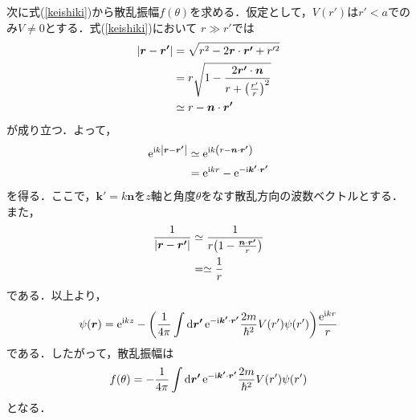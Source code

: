 \documentclass{report}
\begin{document}
  次に式(\ref{keishiki})から散乱振幅$f(\theta)$を求める．仮定として，$V(r')$は$r'<a$でのみ$V\neq 0$とする．式(\ref{keishiki})において
  $r  \gg r'$では
  \begin{align}
    \abs{\bm{r} - \bm{r'}} &= \sqrt{r^2 - 2\bm{r} \cdot \bm{r'} + r'^2}\\
    &= r \sqrt{1 - \frac{2\bm{r'} \cdot \bm{n}}{r + \qty(\frac{r'}{r})^2}}\\
    &\simeq r - \bm{n}\cdot\bm{r'}
  \end{align}
  が成り立つ．よって，
  \begin{align}
    \mathrm{e}^{\mathrm{i} k \abs{\bm{r} - \bm{r'}}} &\simeq \mathrm{e}^{\mathrm{i} k \qty(r - \bm{n} \cdot \bm{r'})}\\
    &= \mathrm{e}^{\mathrm{i} k r} - \mathrm{e}^{-\mathrm{i} \bm{k'} \cdot \bm{r'}}
  \end{align}
  を得る．ここで，$\bm{k'} = k \bm{n}$を$z$軸と角度$\theta$をなす散乱方向の波数ベクトルとする．また，
  \begin{align}
    \frac{1}{\abs{\bm{r} - \bm{r'}}} &\simeq \frac{1}{r\qty(1 - \frac{\bm{n}\cdot\bm{r'}}{r})}\\
    &= \simeq \frac{1}{r}
  \end{align}
  である．以上より，
  \begin{align}
    \psi(\bm{r}) = \mathrm{e}^{\mathrm{i} kz} - \qty(\frac{1}{4\pi} \int \dd{\bm{r'}} \mathrm{e}^{- \mathrm{i} \bm{k'} \cdot \bm{r'}} \frac{2m}{\hbar^2}V(r')\psi(r'))\frac{\mathrm{e}^{\mathrm{i} kr}}{r}
  \end{align}
  である．したがって，散乱振幅は
  \begin{align}
    f(\theta) = -\frac{1}{4\pi} \int \dd{\bm{r'}} \mathrm{e}^{- \mathrm{i} \bm{k'} \cdot \bm{r'}} \frac{2m}{\hbar^2}V(r')\psi(r')
  \end{align}
  となる．
\end{document}
